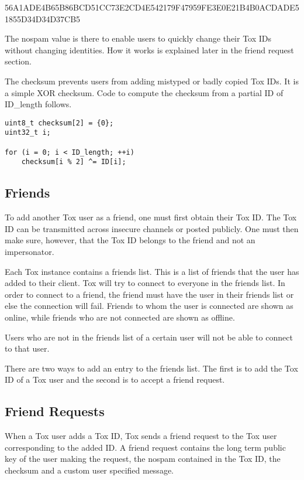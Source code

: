 \documentclass{tox}
\begin{document}
56A1ADE4B65B86BCD51CC73E2CD4E542179F47959FE3E0E21B4B0ACDADE51855D34D34D37CB5

The nospam value is there to enable users to quickly change their Tox IDs 
without changing identities. How it works is explained later in the friend 
request section.

The checksum prevents users from adding mistyped or badly copied Tox IDs. It is 
a simple XOR checksum. Code to compute the checksum from a partial ID of 
ID\_length follows.

\begin{lstlisting}
uint8_t checksum[2] = {0};
uint32_t i;

for (i = 0; i < ID_length; ++i)
    checksum[i % 2] ^= ID[i];

\end{lstlisting}

\subsection{Friends}

To add another Tox user as a friend, one must first obtain their Tox ID. The
Tox ID can be transmitted across insecure channels or posted publicly. One 
must then make sure, however, that the Tox ID belongs to the friend and 
not an impersonator.

Each Tox instance contains a friends list. This is a list of friends 
that the user has added to their client. Tox will try to connect to everyone in 
the friends list. In order to connect to a friend, the friend must have the 
user in their friends list or else the connection will fail. Friends to whom the 
user is connected are shown as online, while friends who are not connected are 
shown as offline.

Users who are not in the friends list of a certain user will not be able to connect
to that user.

There are two ways to add an entry to the friends list. The first is to add the 
Tox ID of a Tox user and the second is to accept a friend request.

\subsection{Friend Requests}

When a Tox user adds a Tox ID, Tox sends a friend request to the Tox user 
corresponding to the added ID. A friend request contains the long term public 
key of the user making the request, the nospam contained in the Tox ID, the checksum and a 
custom user specified message.
\end{document}
